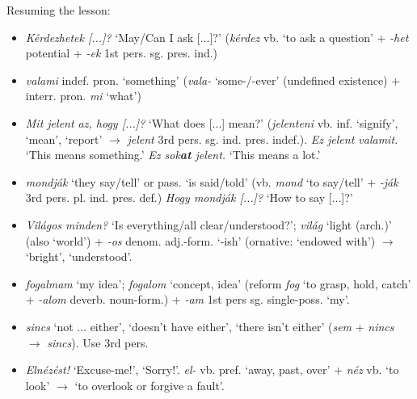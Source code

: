 \documentclass[a4paper,11pt]{article}
\begin{document}
\noindent Resuming the lesson:
\begin{itemize}

  \item \emph{Kérdezhetek [...]?} `May/Can I ask [...]?'
    (\emph{kérdez} vb. `to ask a question' + \emph{-het} potential +
    \emph{-ek} 1st pers. sg. pres. ind.)

  \item \emph{valami} indef. pron. `something' (\emph{vala-}
    `some-/-ever' (undefined existence) + interr. pron. \emph{mi}
    `what')

  \item \emph{Mit jelent az, hogy [...]?}  `What does [...] mean?'
    (\emph{jelenteni} vb. inf. `signify', `mean', `report'
    $\rightarrow$ \emph{jelent} 3rd
    pers. sg. ind. pres. indef.). \emph{Ez jelent valamit.} `This
    means something.' \emph{Ez sok\textbf{at} jelent.} `This means a
    lot.'

  \item \emph{mondják} `they say/tell' or pass. `is said/told'
    (vb. \emph{mond} `to say/tell' + \emph{-ják} 3rd
    pers. pl. ind. pres. def.) \emph{Hogy mondják [...]?} `How to say
    [...]?'

  \item \emph{Világos minden?} `Is everything/all clear/understood?';
    \emph{világ} `light (arch.)' (also `world') + \emph{-os} denom.
    adj.-form. `-ish' (ornative: `endowed with') $\rightarrow$
    `bright', `understood'.

  \item \emph{fogalmam} `my idea'; \emph{fogalom} `concept, idea'
    (reform \emph{fog} `to grasp, hold, catch' + \emph{-alom}
    deverb. noun\hyp{}form.) + \emph{-am} 1st pers
    sg. single\hyp{}poss. `my'.

  \item \emph{sincs} `not ... either', `doesn't have either', `there
    isn't either' (\emph{sem} + \emph{nincs} $\rightarrow$
    \emph{sincs}). Use 3rd pers.

    \item \emph{Elnézést!} `Excuse-me!', `Sorry!'. \emph{el-}
      vb. pref. `away, past, over' + \emph{néz} vb. `to look'
      $\rightarrow$ `to overlook or forgive a fault'.
\end{itemize}
\end{document}
